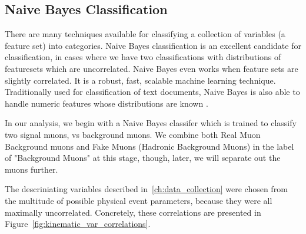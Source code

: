 \subsection{Naive Bayes Classification}
There are many techniques available for classifying a collection of variables
(a feature set) into categories. Naive Bayes classification is an excellent
candidate for classification, in cases where we have two classifications with
distributions of featuresets which are uncorrelated. Naive Bayes even works when
feature sets are slightly correlated. It is a robust, fast, scalable machine
learning technique. Traditionally used for classification of text documents,
Naive Bayes is also able to handle numeric features whose distributions are
known \cite{Collins2013}.

In our analysis, we begin with a Naive Bayes classifer which is trained to
classify two signal muons, vs background muons. We combine both Real Muon
Background muons and Fake Muons (Hadronic Background Muons) in the label of
"Background Muons" at this stage, though, later, we will separate out the muons
further.

The descriniating variables described in~\ref{ch:data_collection} were
chosen from the multitude of possible physical event parameters, because they
were all maximally uncorrelated. Concretely, these correlations are presented in
Figure~\ref{fig:kinematic_var_correlations}.

